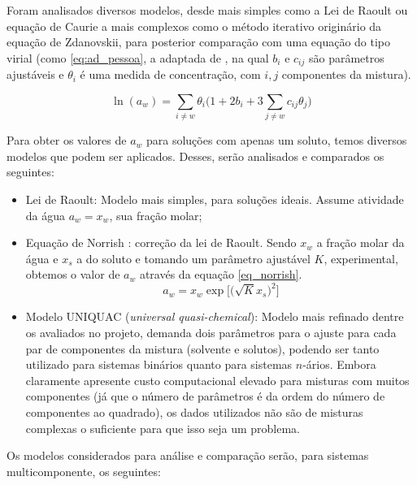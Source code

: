 \documentclass[
	12pt,				%
	openright,
	twoside,
	a4paper,			%
	english,			%
	french,				%
	spanish,			%
	brazil				%
	]{abntex2}
\begin{document}
Foram analisados diversos modelos, desde mais simples como a Lei de Raoult ou
equação de Caurie a mais complexos como o método iterativo originário da equação
de Zdanovskii, para posterior comparação com uma equação do tipo virial (como
\ref{eq:ad_pessoa}, a adaptada de \cite{pessoa2008}, na qual $b_i$ e
$c_{ij}$ são parâmetros ajustáveis e $\theta_i$ é uma medida de concentração,
com $i,j$ componentes da mistura).

\begin{equation}
	\label{eq:ad_pessoa}
	\ln(a_w) = \sum_{i \neq w}\theta_i\Bigg(1 +%
	2b_i+3\sum_{j \neq w}c_{ij}\theta_j\Bigg)
\end{equation}

Para obter os valores de $a_w$ para soluções com apenas um soluto, temos
diversos modelos que podem ser aplicados. Desses, serão analisados e comparados
os seguintes:

\begin{itemize}
	\item Lei de Raoult: Modelo mais simples, para soluções ideais. Assume
		atividade da água $a_w = x_w$, sua fração molar;
	\item Equação de Norrish \cite{norrish1966}: correção da lei de Raoult.
		Sendo $x_w$ a fração molar da água e $x_s$ a do soluto e
		tomando um parâmetro ajustável $K$, experimental, obtemos o
		valor de $a_w$ através da equação \ref{eq_norrish}.
		\begin{equation}
			\label{eq_norrish}
			a_w = x_w\exp\Big[\Big(\sqrt{K}x_s\Big)^2\Big]
		\end{equation}
	\item Modelo UNIQUAC (\textit{universal quasi-chemical}):
		\cite{abrams1975} Modelo mais refinado dentre os avaliados no
		projeto, demanda dois parâmetros para o ajuste para cada par de
		componentes da mistura (solvente e solutos), podendo ser tanto
		utilizado para sistemas binários quanto para sistemas $n$-ários.
		Embora claramente apresente custo computacional elevado para
		misturas com muitos componentes (já que o número de parâmetros
		é da ordem do número de componentes ao quadrado), os dados
		utilizados não são de misturas complexas o suficiente para que
		isso seja um problema.
\end{itemize}

Os modelos considerados para análise e comparação serão, para sistemas
multicomponente, os seguintes:
\end{document}
